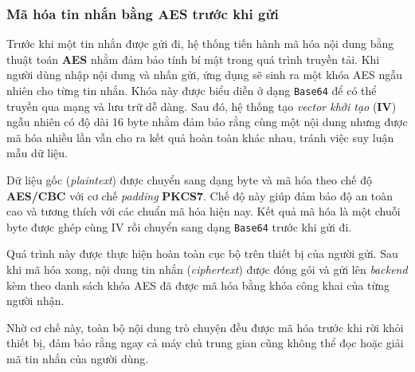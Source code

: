 \subsubsection{Mã hóa tin nhắn bằng AES trước khi gửi}
\indent Trước khi một tin nhắn được gửi đi, hệ thống tiến hành mã hóa nội dung bằng thuật toán \textbf{AES} nhằm đảm bảo tính bí mật trong quá trình truyền tải.  
Khi người dùng nhập nội dung và nhấn gửi, ứng dụng sẽ sinh ra một khóa AES ngẫu nhiên cho từng tin nhắn.  
Khóa này được biểu diễn ở dạng \texttt{Base64} để có thể truyền qua mạng và lưu trữ dễ dàng.  
Sau đó, hệ thống tạo \textit{vector khởi tạo} (\textbf{IV}) ngẫu nhiên có độ dài 16 byte nhằm đảm bảo rằng cùng một nội dung nhưng được mã hóa nhiều lần vẫn cho ra kết quả hoàn toàn khác nhau, tránh việc suy luận mẫu dữ liệu.

\indent Dữ liệu gốc (\textit{plaintext}) được chuyển sang dạng byte và mã hóa theo chế độ \textbf{AES/CBC} với cơ chế \textit{padding} \textbf{PKCS7}.  
Chế độ này giúp đảm bảo độ an toàn cao và tương thích với các chuẩn mã hóa hiện nay.  
Kết quả mã hóa là một chuỗi byte được ghép cùng IV rồi chuyển sang dạng \texttt{Base64} trước khi gửi đi.

\indent Quá trình này được thực hiện hoàn toàn cục bộ trên thiết bị của người gửi.  
Sau khi mã hóa xong, nội dung tin nhắn (\textit{ciphertext}) được đóng gói và gửi lên \textit{backend} kèm theo danh sách khóa AES đã được mã hóa bằng khóa công khai của từng người nhận.

\indent Nhờ cơ chế này, toàn bộ nội dung trò chuyện đều được mã hóa trước khi rời khỏi thiết bị, đảm bảo rằng ngay cả máy chủ trung gian cũng không thể đọc hoặc giải mã tin nhắn của người dùng.
